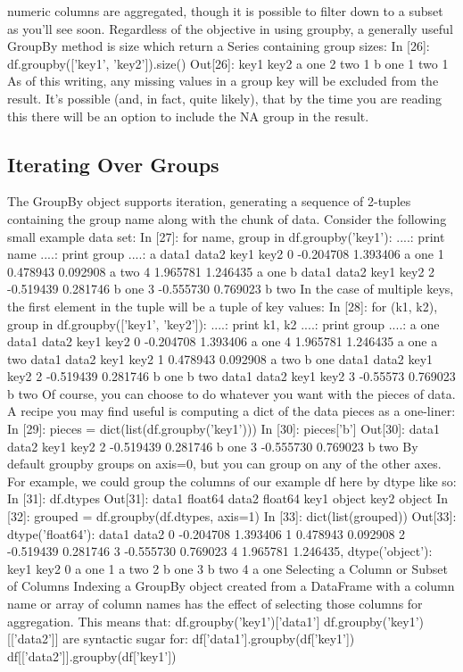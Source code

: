 numeric columns are aggregated, though it is possible to filter down to a subset as you’ll
see soon.
Regardless of the objective in using groupby, a generally useful GroupBy method is
size which return a Series containing group sizes:
In [26]: df.groupby(['key1', 'key2']).size()
Out[26]:
key1 key2
a one 2
two 1
b one 1
two 1
As of this writing, any missing values in a group key will be excluded
from the result. It’s possible (and, in fact, quite likely), that by the time
you are reading this there will be an option to include the NA group in
the result.
\subsection{Iterating Over Groups}
The GroupBy object supports iteration, generating a sequence of 2-tuples containing
the group name along with the chunk of data. Consider the following small example
data set:
In [27]: for name, group in df.groupby('key1'):
....: print name
....: print group
....:
a
data1 data2 key1 key2
0 -0.204708 1.393406 a one
1 0.478943 0.092908 a two
4 1.965781 1.246435 a one
b
data1 data2 key1 key2
2 -0.519439 0.281746 b one
3 -0.555730 0.769023 b two
In the case of multiple keys, the first element in the tuple will be a tuple of key values:
In [28]: for (k1, k2), group in df.groupby(['key1', 'key2']):
....: print k1, k2
....: print group
....:
a one
data1 data2 key1 key2
0 -0.204708 1.393406 a one
4 1.965781 1.246435 a one
a two
data1 data2 key1 key2
1 0.478943 0.092908 a two
b one
data1 data2 key1 key2
2 -0.519439 0.281746 b one
b two
data1 data2 key1 key2
3 -0.55573 0.769023 b two
Of course, you can choose to do whatever you want with the pieces of data. A recipe
you may find useful is computing a dict of the data pieces as a one-liner:
In [29]: pieces = dict(list(df.groupby('key1')))
In [30]: pieces['b']
Out[30]:
data1 data2 key1 key2
2 -0.519439 0.281746 b one
3 -0.555730 0.769023 b two
By default groupby groups on axis=0, but you can group on any of the other axes. For
example, we could group the columns of our example df here by dtype like so:
In [31]: df.dtypes
Out[31]:
data1 float64
data2 float64
key1 object
key2 object
In [32]: grouped = df.groupby(df.dtypes, axis=1)
In [33]: dict(list(grouped))
Out[33]:
{dtype('float64'): data1 data2
0 -0.204708 1.393406
1 0.478943 0.092908
2 -0.519439 0.281746
3 -0.555730 0.769023
4 1.965781 1.246435,
dtype('object'): key1 key2
0 a one
1 a two
2 b one
3 b two
4 a one}
Selecting a Column or Subset of Columns
Indexing a GroupBy object created from a DataFrame with a column name or array of
column names has the effect of selecting those columns for aggregation. This means that:
df.groupby('key1')['data1']
df.groupby('key1')[['data2']]
are syntactic sugar for:
df['data1'].groupby(df['key1'])
df[['data2']].groupby(df['key1'])
